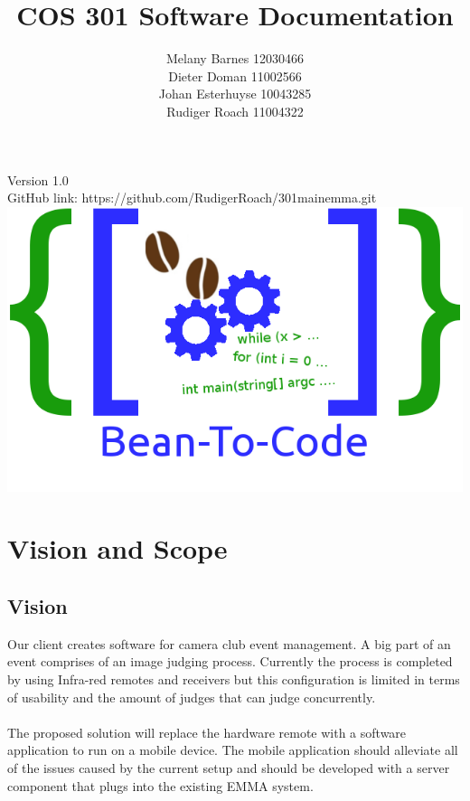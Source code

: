 \documentclass[10pt,a4paper]{article}
\title{COS 301 Software Documentation}
\author{Melany Barnes 12030466 \\
		Dieter Doman 11002566 \\
		Johan Esterhuyse 10043285 \\
		Rudiger Roach 11004322 }
\date{}
\begin{document}
\maketitle
\begin{center}
Version 1.0 \\
GitHub link: https://github.com/RudigerRoach/301\textunderscore main\textunderscore emma.git \\
\vspace*{5\baselineskip}
\includegraphics[scale=0.35]{Pictures/Logo.png}
\end{center}
\pagebreak
\tableofcontents
\pagebreak
\section{Vision and Scope}

\subsection{Vision}
Our client creates software for camera club event management. A big part of an event comprises of an image judging process. Currently the process is completed by using Infra-red remotes and receivers but this configuration is limited in terms of usability and the amount of judges that can judge concurrently.\\\\
The proposed solution will replace the hardware remote with a software application to run on a mobile device. The mobile application should alleviate all of the issues caused by the current setup and should be developed with a server component that plugs into the existing EMMA system.  
\end{document}
